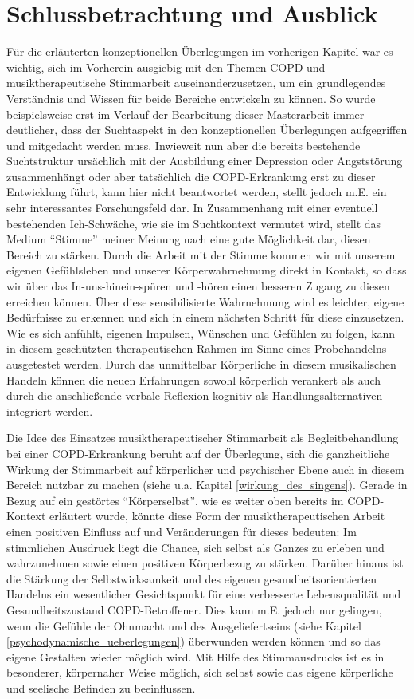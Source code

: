 \chapter{Schlussbetrachtung und Ausblick} %
Für die erläuterten konzeptionellen Überlegungen im vorherigen Kapitel war es wichtig, sich im Vorherein ausgiebig mit den Themen COPD und musiktherapeutische Stimmarbeit auseinanderzusetzen, um ein grundlegendes Verständnis und Wissen für beide Bereiche entwickeln zu können. So wurde beispielsweise erst im Verlauf der Bearbeitung dieser Masterarbeit immer deutlicher, dass der Suchtaspekt in den konzeptionellen Überlegungen aufgegriffen und mitgedacht werden muss. Inwieweit nun aber die bereits bestehende Suchtstruktur ursächlich mit der Ausbildung einer Depression oder Angststörung zusammenhängt oder aber tatsächlich die COPD-Erkrankung erst zu dieser Entwicklung führt, kann hier nicht beantwortet werden, stellt jedoch m.E. ein sehr interessantes Forschungsfeld dar. In Zusammenhang mit einer eventuell bestehenden Ich-Schwäche, wie sie im Suchtkontext vermutet wird, stellt das Medium "`Stimme"' meiner Meinung nach eine gute Möglichkeit dar, diesen Bereich zu stärken. Durch die Arbeit mit der Stimme kommen wir mit unserem eigenen Gefühlsleben und unserer Körperwahrnehmung direkt in Kontakt, so dass wir über das In-uns-hinein-spüren und -hören einen besseren Zugang zu diesen erreichen können. Über diese sensibilisierte Wahrnehmung wird es leichter, eigene Bedürfnisse zu erkennen und sich in einem nächsten Schritt für diese einzusetzen. Wie es sich anfühlt, eigenen Impulsen, Wünschen und Gefühlen zu folgen, kann in diesem geschützten therapeutischen Rahmen im Sinne eines Probehandelns ausgetestet werden. Durch das unmittelbar Körperliche in diesem musikalischen Handeln können die neuen Erfahrungen sowohl körperlich verankert als auch durch die anschließende verbale Reflexion kognitiv als Handlungsalternativen integriert werden.

Die Idee des Einsatzes musiktherapeutischer Stimmarbeit als Begleitbehandlung bei einer COPD-Erkrankung beruht auf der Überlegung, sich die ganzheitliche Wirkung der Stimmarbeit auf körperlicher und psychischer Ebene auch in diesem Bereich nutzbar zu machen (siehe u.a. Kapitel \ref{wirkung_des_singens}). Gerade in Bezug auf ein gestörtes "`Körperselbst"', wie es weiter oben bereits im COPD-Kontext erläutert wurde, könnte diese Form der musiktherapeutischen Arbeit einen positiven Einfluss auf und Veränderungen für dieses bedeuten: Im stimmlichen Ausdruck liegt die Chance, sich selbst als Ganzes zu erleben und wahrzunehmen sowie einen positiven Körperbezug zu stärken. Darüber hinaus ist die Stärkung der Selbstwirksamkeit und des eigenen gesundheitsorientierten Handelns ein wesentlicher Gesichtspunkt für eine verbesserte Lebensqualität und Gesundheitszustand COPD-Betroffener. Dies kann m.E. jedoch nur gelingen, wenn die Gefühle der Ohnmacht und des Ausgeliefertseins (siehe Kapitel \ref{psychodynamische_ueberlegungen}) überwunden werden können und so das eigene Gestalten wieder möglich wird. Mit Hilfe des Stimmausdrucks ist es in besonderer, körpernaher Weise möglich, sich selbst sowie das eigene körperliche und seelische Befinden zu beeinflussen. 


